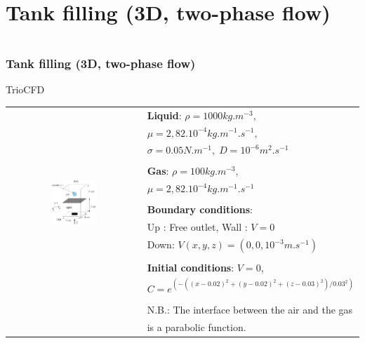 \documentclass[10pt, hyperref={unicode=true,pdfusetitle, bookmarks=true,bookmarksnumbered=false,bookmarksopen=false, breaklinks=false,pdfborder={0 0 1},backref=true,colorlinks=true,linkcolor=darkblue,pageanchor}]{beamer}
\begin{document}
\section{{\bf{Tank filling (3D, two-phase flow)}}}
\begin{frame}
\begin{small}
\begin{columns}[c] 
\tableofcontents[sections={1-9},currentsection, currentsubsection]
\tableofcontents[sections={10-16},currentsection, currentsubsection]
\end{columns}
\end{small}
\end{frame}
\begin{frame}
\frametitle{Tank filling (3D, two-phase flow)}
\begin{block}{TrioCFD}


\begin{tabular}{cl}
\multirow{14}{*}{\includegraphics[width=0.35\textwidth]{PICTURES/tank3D}}
 & \textbf{Liquid}: $\rho=1000kg.m^{-3},$ \tabularnewline
 & $\mu=2,82.10^{-4}kg.m^{-1}.s^{-1},$ \tabularnewline
 & $\sigma=0.05N.m^{-1},\; D=10^{-6}m^{2}.s^{-1}$\tabularnewline
 & \tabularnewline
 & \textbf{Gas}: $\rho=100kg.m^{-3},$\tabularnewline
 & $\mu=2,82.10^{-4}kg.m^{-1}.s^{-1}$\tabularnewline
 & \tabularnewline
 & \textbf{Boundary conditions}:  \tabularnewline
 & Up : Free outlet, \hspace{0.5cm} Wall : $V=0$ \tabularnewline
 & Down: $V(x,y,z)=(0,0,10^{-3}m.s^{-1})$\tabularnewline
 & \tabularnewline
 & \textbf{Initial conditions}: $V=0$, \tabularnewline
 & $C=e^{(-((x-0.02)^{2}+(y-0.02)^{2}+(z-0.03)^{2})/0.03^{2})}$ \tabularnewline
 & \tabularnewline
 & N.B.: The interface between the air and the gas\tabularnewline
 & is a parabolic function.\tabularnewline
\end{tabular}

\end{block}
\end{frame}
\end{document}
